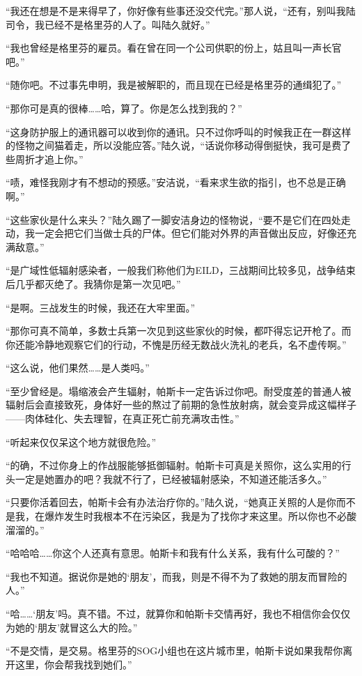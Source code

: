 “我还在想是不是来得早了，你好像有些事还没交代完。”那人说，“还有，别叫我陆司令，我已经不是格里芬的人了。叫陆久就好。”

“我也曾经是格里芬的雇员。看在曾在同一个公司供职的份上，姑且叫一声长官吧。”

“随你吧。不过事先申明，我是被解职的，而且现在已经是格里芬的通缉犯了。”

“那你可是真的很棒……哈，算了。你是怎么找到我的？”

“这身防护服上的通讯器可以收到你的通讯。只不过你呼叫的时候我正在一群这样的怪物之间猫着走，所以没能应答。”陆久说，“话说你移动得倒挺快，我可是费了些周折才追上你。”

“啧，难怪我刚才有不想动的预感。”安洁说，“看来求生欲的指引，也不总是正确啊。”

“这些家伙是什么来头？”陆久踢了一脚安洁身边的怪物说，“要不是它们在四处走动，我一定会把它们当做士兵的尸体。但它们能对外界的声音做出反应，好像还充满敌意。”

“是广域性低辐射感染者，一般我们称他们为EILD，三战期间比较多见，战争结束后几乎都灭绝了。我猜你是第一次见吧。”

“是啊。三战发生的时候，我还在大牢里面。”

“那你可真不简单，多数士兵第一次见到这些家伙的时候，都吓得忘记开枪了。而你还能冷静地观察它们的行动，不愧是历经无数战火洗礼的老兵，名不虚传啊。”

“这么说，他们果然……是人类吗。”

“至少曾经是。塌缩液会产生辐射，帕斯卡一定告诉过你吧。耐受度差的普通人被辐射后会直接致死，身体好一些的熬过了前期的急性放射病，就会变异成这幅样子——肉体硅化、失去理智，在真正死亡前充满攻击性。”

“听起来仅仅呆这个地方就很危险。”

“的确，不过你身上的作战服能够抵御辐射。帕斯卡可真是关照你，这么实用的行头一定是她置办的吧？我就不行了，已经被辐射感染，不知道还能活多久。”

“只要你活着回去，帕斯卡会有办法治疗你的。”陆久说，“她真正关照的人是你而不是我，在爆炸发生时我根本不在污染区，我是为了找你才来这里。所以你也不必酸溜溜的。”

“哈哈哈……你这个人还真有意思。帕斯卡和我有什么关系，我有什么可酸的？”

“我也不知道。据说你是她的‘朋友’，而我，则是不得不为了救她的朋友而冒险的人。”

“哈……‘朋友’吗。真不错。不过，就算你和帕斯卡交情再好，我也不相信你会仅仅为她的‘朋友’就冒这么大的险。”

“不是交情，是交易。格里芬的SOG小组也在这片城市里，帕斯卡说如果我帮你离开这里，你会帮我找到她们。”

